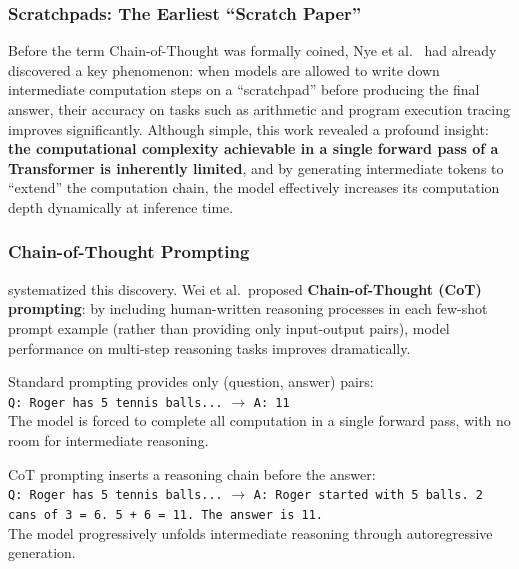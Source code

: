\subsubsection{Scratchpads: The Earliest ``Scratch Paper''}

Before the term Chain-of-Thought was formally coined,
Nye et al.\ \cite{nye2021scratchpad} had already discovered a key phenomenon:
when models are allowed to write down intermediate computation steps on a ``scratchpad'' before producing the final answer,
their accuracy on tasks such as arithmetic and program execution tracing improves significantly.
Although simple, this work revealed a profound insight:
\textbf{the computational complexity achievable in a single forward pass of a Transformer is inherently limited},
and by generating intermediate tokens to ``extend'' the computation chain,
the model effectively increases its computation depth dynamically at inference time.

\subsubsection{Chain-of-Thought Prompting}
\label{sec:t4-cot}

 systematized this discovery.
Wei et al.\ proposed \textbf{Chain-of-Thought (CoT) prompting}:
by including human-written reasoning processes in each few-shot prompt example
(rather than providing only input-output pairs),
model performance on multi-step reasoning tasks improves dramatically.

\begin{problembox}
Standard prompting provides only (question, answer) pairs:\\
\texttt{Q: Roger has 5 tennis balls...} $\rightarrow$ \texttt{A: 11}\\
The model is forced to complete all computation in a single forward pass, with no room for intermediate reasoning.
\end{problembox}

\begin{solutionbox}
CoT prompting inserts a reasoning chain before the answer:\\
\texttt{Q: Roger has 5 tennis balls...} $\rightarrow$
\texttt{A: Roger started with 5 balls. 2 cans of 3 = 6. 5 + 6 = 11. The answer is 11.}\\
The model progressively unfolds intermediate reasoning through autoregressive generation.
\end{solutionbox}

